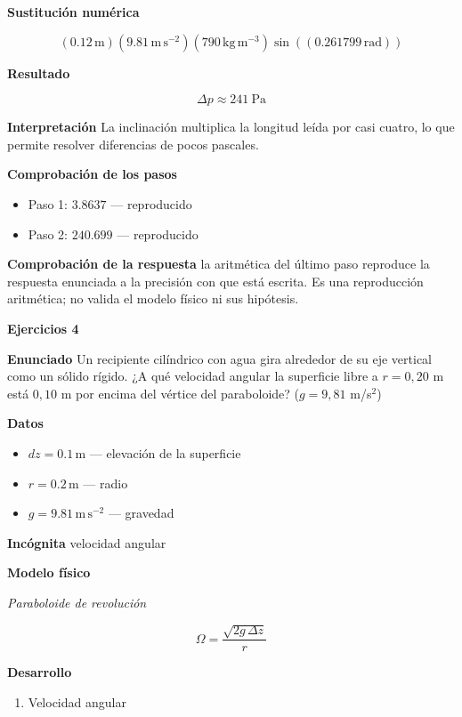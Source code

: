 \documentclass[10pt,openany]{book}
\begin{document}
\noindent\textbf{Sustitución numérica}

\[
\left(0.12\,\mathrm{m}\right) \left(9.81\,\mathrm{m}\,\mathrm{s}^{-2}\right) \left(790\,\mathrm{kg}\,\mathrm{m}^{-3}\right) \sin{\left(\left(0.261799\,\mathrm{rad}\right) \right)}
\]

\noindent\textbf{Resultado}

\[
\Delta p \approx 241\ \mathrm{Pa}
\]

\noindent\textbf{Interpretación}
La inclinación multiplica la longitud leída por casi cuatro, lo que permite resolver diferencias de pocos pascales.

\noindent\textbf{Comprobación de los pasos}
\begin{itemize}
\item Paso 1: $3.8637$ — reproducido
\item Paso 2: $240.699$ — reproducido
\end{itemize}

\noindent\textbf{Comprobación de la respuesta} la aritmética del último paso reproduce la respuesta enunciada a la precisión con que está escrita. Es una reproducción aritmética; no valida el modelo físico ni sus hipótesis.

\noindent\textbf{Ejercicios 4}

\noindent\textbf{Enunciado}
Un recipiente cilíndrico con agua gira alrededor de su eje vertical como un sólido rígido. ¿A qué velocidad angular la superficie libre a \(r = 0{,}20\) m está \(0{,}10\) m por encima del vértice del paraboloide? (\(g = 9{,}81\) m/s\(^2\))

\noindent\textbf{Datos}
\begin{itemize}
\item $dz = 0.1\,\mathrm{m}$ — elevación de la superficie
\item $r = 0.2\,\mathrm{m}$ — radio
\item $g = 9.81\,\mathrm{m}\,\mathrm{s}^{-2}$ — gravedad
\end{itemize}

\noindent\textbf{Incógnita}
velocidad angular

\noindent\textbf{Modelo físico}

\noindent\textit{Paraboloide de revolución}

\[
\Omega = \frac{\sqrt{2 g\,\Delta z}}{r}
\]

\noindent\textbf{Desarrollo}
\begin{enumerate}
\item
Velocidad angular
\end{enumerate}
\end{document}
